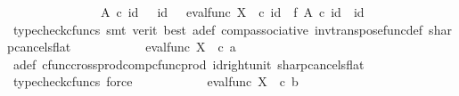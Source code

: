 \begin{isabellebody}
\ \ \ \ \isamarkupfalse%
\ {\isacharminus}{\kern0pt}\ \isanewline
\ \ \ \ \ \ \isamarkupfalse%
\ {\isachardoublequoteopen}A\isactrlsup {\isasymflat}\ {\isasymcirc}\isactrlsub c\ {\isasymlangle}id\ {\isasymone}\ {\isacharcomma}{\kern0pt}\ id\ {\isasymone}{\isasymrangle}\ {\isacharequal}{\kern0pt}\ {\isacharparenleft}{\kern0pt}eval{\isacharunderscore}{\kern0pt}func\ X\ {\isasymone}{\isacharparenright}{\kern0pt}\ {\isasymcirc}\isactrlsub c\ {\isacharparenleft}{\kern0pt}id\ {\isasymone}\ {\isasymtimes}\isactrlsub f\ {\isacharparenleft}{\kern0pt}A\isactrlsup {\isasymflat}{\isacharparenright}{\kern0pt}\isactrlsup {\isasymsharp}{\isacharparenright}{\kern0pt}\ {\isasymcirc}\isactrlsub c\ {\isasymlangle}id\ {\isasymone}{\isacharcomma}{\kern0pt}\ id\ {\isasymone}{\isasymrangle}{\isachardoublequoteclose}\isanewline
\ \ \ \ \ \ \ \ \isamarkupfalse%
\ {\isacharparenleft}{\kern0pt}typecheck{\isacharunderscore}{\kern0pt}cfuncs{\isacharcomma}{\kern0pt}\ smt\ {\isacharparenleft}{\kern0pt}verit{\isacharcomma}{\kern0pt}\ best{\isacharparenright}{\kern0pt}\ a{\isacharunderscore}{\kern0pt}def\ comp{\isacharunderscore}{\kern0pt}associative{}\ inv{\isacharunderscore}{\kern0pt}transpose{\isacharunderscore}{\kern0pt}func{\isacharunderscore}{\kern0pt}def{}\ sharp{\isacharunderscore}{\kern0pt}cancels{\isacharunderscore}{\kern0pt}flat{\isacharparenright}{\kern0pt}\isanewline
\ \ \ \ \ \ \isamarkupfalse%
\ \isamarkupfalse%
\ {\isachardoublequoteopen}{\isachardot}{\kern0pt}{\isachardot}{\kern0pt}{\isachardot}{\kern0pt}\ {\isacharequal}{\kern0pt}\ eval{\isacharunderscore}{\kern0pt}func\ X\ {\isasymone}\ {\isasymcirc}\isactrlsub c\ a{\isachardoublequoteclose}\isanewline
\ \ \ \ \ \ \ \ \isamarkupfalse%
\ a{\isacharunderscore}{\kern0pt}def\ cfunc{\isacharunderscore}{\kern0pt}cross{\isacharunderscore}{\kern0pt}prod{\isacharunderscore}{\kern0pt}comp{\isacharunderscore}{\kern0pt}cfunc{\isacharunderscore}{\kern0pt}prod\ id{\isacharunderscore}{\kern0pt}right{\isacharunderscore}{\kern0pt}unit{}\ sharp{\isacharunderscore}{\kern0pt}cancels{\isacharunderscore}{\kern0pt}flat\ \isamarkupfalse%
\ {\isacharparenleft}{\kern0pt}typecheck{\isacharunderscore}{\kern0pt}cfuncs{\isacharcomma}{\kern0pt}\ force{\isacharparenright}{\kern0pt}\isanewline
\ \ \ \ \ \ \isamarkupfalse%
\ \isamarkupfalse%
\ {\isachardoublequoteopen}{\isachardot}{\kern0pt}{\isachardot}{\kern0pt}{\isachardot}{\kern0pt}\ {\isacharequal}{\kern0pt}\ eval{\isacharunderscore}{\kern0pt}func\ X\ {\isasymone}\ {\isasymcirc}\isactrlsub c\ b{\isachardoublequoteclose}\isanewline

\end{isabellebody}
